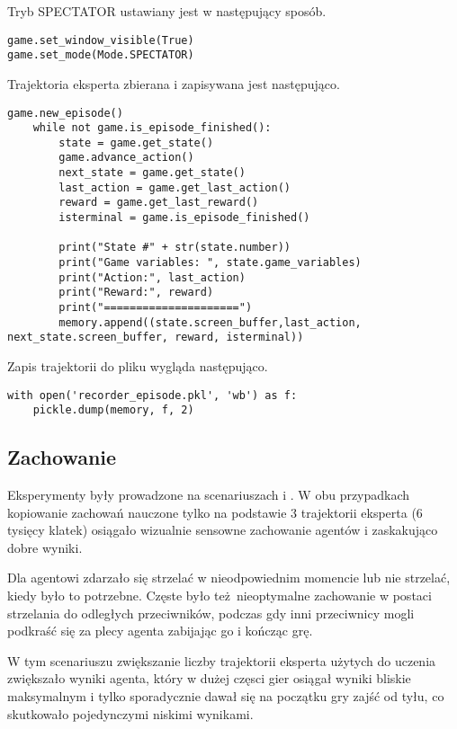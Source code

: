 \vspace{5mm}

Tryb SPECTATOR ustawiany jest w następujący sposób.
\begin{lstlisting}[language=iPython]
game.set_window_visible(True)
game.set_mode(Mode.SPECTATOR)
\end{lstlisting}

Trajektoria eksperta zbierana i zapisywana jest następująco.

\begin{lstlisting}[language=iPython]
    game.new_episode()
    while not game.is_episode_finished():
        state = game.get_state()
        game.advance_action()
        next_state = game.get_state()
        last_action = game.get_last_action()
        reward = game.get_last_reward()
        isterminal = game.is_episode_finished()

        print("State #" + str(state.number))
        print("Game variables: ", state.game_variables)
        print("Action:", last_action)
        print("Reward:", reward)
        print("=====================")
        memory.append((state.screen_buffer,last_action, next_state.screen_buffer, reward, isterminal))
\end{lstlisting}

Zapis trajektorii do pliku wygląda następująco.

\begin{lstlisting}[language=iPython]
with open('recorder_episode.pkl', 'wb') as f:
    pickle.dump(memory, f, 2)
\end{lstlisting}

\subsection{Zachowanie}
Eksperymenty były prowadzone na scenariuszach  i .
W obu przypadkach kopiowanie zachowań nauczone tylko na podstawie 3 trajektorii eksperta (6 tysięcy klatek) osiągało wizualnie sensowne zachowanie agentów i zaskakująco dobre wyniki.

Dla  agentowi zdarzało się strzelać w nieodpowiednim momencie lub nie strzelać, kiedy było to potrzebne. Częste było też nieoptymalne zachowanie w postaci strzelania do odległych przeciwników, podczas gdy inni przeciwnicy mogli podkraść się za plecy agenta zabijając go i kończąc grę.

W tym scenariuszu zwiększanie liczby trajektorii eksperta użytych do uczenia zwiększało wyniki agenta, który w dużej częsci gier osiągał wyniki bliskie maksymalnym i tylko sporadycznie dawał się na początku gry zajść od tyłu, co skutkowało pojedynczymi niskimi wynikami.

